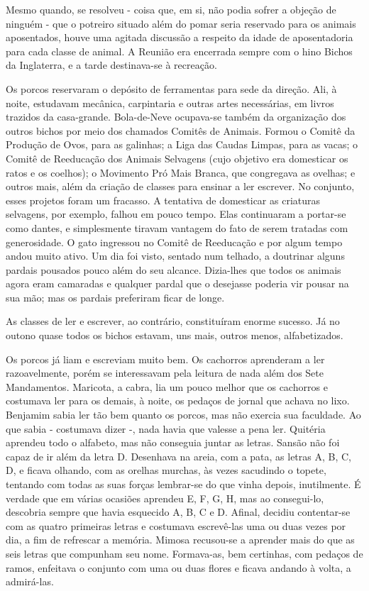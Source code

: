 Mesmo quando, se resolveu - coisa que, em si, não podia sofrer a objeção de ninguém - que o potreiro
situado além do pomar seria reservado para os animais aposentados, houve uma agitada discussão a respeito da idade de aposentadoria para cada classe de animal. A Reunião era encerrada sempre com o
hino Bichos da Inglaterra, e a tarde destinava-se à recreação.

Os porcos reservaram o depósito de ferramentas para sede da direção. Ali, à noite, estudavam mecânica,
carpintaria e outras artes necessárias, em livros trazidos da casa-grande. Bola-de-Neve ocupava-se
também da organização dos outros bichos por meio dos chamados Comitês de Animais. Formou o
Comitê da Produção de Ovos, para as galinhas; a Liga das Caudas Limpas, para as vacas; o Comitê de
Reeducação dos Animais Selvagens (cujo objetivo era domesticar os ratos e os coelhos); o Movimento
Pró Mais Branca, que congregava as ovelhas; e outros mais, além da criação de classes para ensinar a ler
escrever. No conjunto, esses projetos foram um fracasso. A tentativa de domesticar as criaturas
selvagens, por exemplo, falhou em pouco tempo. Elas continuaram a portar-se como dantes, e
simplesmente tiravam vantagem do fato de serem tratadas com generosidade. O gato ingressou no
Comitê de Reeducação e por algum tempo andou muito ativo. Um dia foi visto, sentado num telhado, a
doutrinar alguns pardais pousados pouco além do seu alcance. Dizia-lhes que todos os animais agora
eram camaradas e qualquer pardal que o desejasse poderia vir pousar na sua mão; mas os pardais
preferiram ficar de longe.

As classes de ler e escrever, ao contrário, constituíram enorme sucesso. Já no outono quase todos os
bichos estavam, uns mais, outros menos, alfabetizados.

Os porcos já liam e escreviam muito bem. Os cachorros aprenderam a ler razoavelmente, porém se
interessavam pela leitura de nada além dos Sete Mandamentos. Maricota, a cabra, lia um pouco melhor
que os cachorros e costumava ler para os demais, à noite, os pedaços de jornal que achava no lixo.
Benjamim sabia ler tão bem quanto os porcos, mas não exercia sua faculdade. Ao que sabia - costumava
dizer -, nada havia que valesse a pena ler. Quitéria aprendeu todo o alfabeto, mas não conseguia juntar as
letras. Sansão não foi capaz de ir além da letra D. Desenhava na areia, com a pata, as letras A, B, C, D, e
ficava olhando, com as orelhas murchas, às vezes sacudindo o topete, tentando com todas as suas forças
lembrar-se do que vinha depois, inutilmente. É verdade que em várias ocasiões aprendeu E, F, G, H, mas
ao consegui-lo, descobria sempre que havia esquecido A, B, C e D. Afinal, decidiu contentar-se com as
quatro primeiras letras e costumava escrevê-las uma ou duas vezes por dia, a fim de refrescar a memória.
Mimosa recusou-se a aprender mais do que as seis letras que compunham seu nome. Formava-as, bem
certinhas, com pedaços de ramos, enfeitava o conjunto com uma ou duas flores e ficava andando à volta,
a admirá-las.

